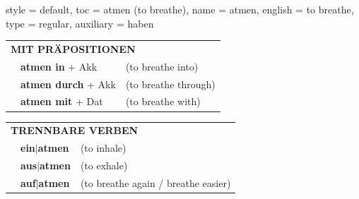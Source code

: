\begin{verbentry}{
  style = {default},
  toc = {atmen (to breathe)},
  name = {atmen},
  english = {to breathe},
  type = {regular},
  auxiliary = {haben}
}
\vspace{10pt}

\begin{tabular}{lll}
\multicolumn{3}{l}{\textbf{MIT PRÄPOSITIONEN}}\\
& \textbf{atmen in} + Akk & (to breathe into)\\
& \textbf{atmen durch} + Akk & (to breathe through)\\
& \textbf{atmen mit} + Dat & (to breathe with)\\
\end{tabular}
\hfill
\begin{tabular}{lll}
\multicolumn{3}{l}{\textbf{TRENNBARE VERBEN}}\\
& \textbf{ein$|$atmen} & (to inhale)\\
& \textbf{aus$|$atmen} & (to exhale)\\
& \textbf{auf$|$atmen} & (to breathe again / breathe easier)\\
\end{tabular}
\vspace{-5pt}
\end{verbentry}
